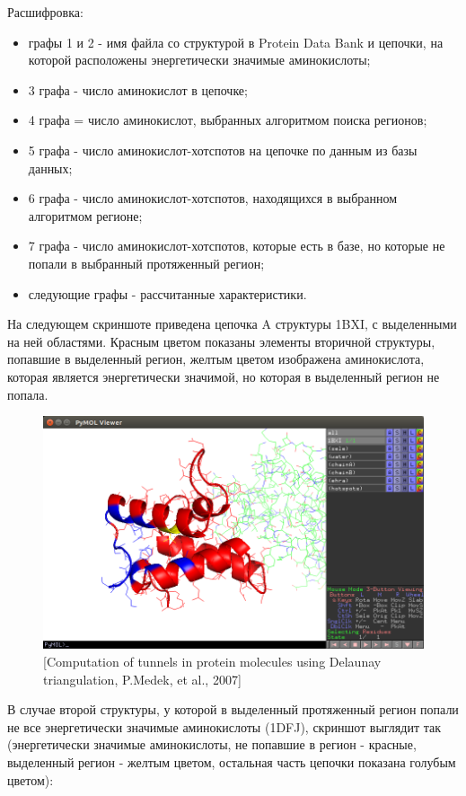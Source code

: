 Расшифровка: 
\begin{itemize}
\item графы 1 и 2 - имя файла со структурой в Protein Data Bank и цепочки, на которой расположены энергетически значимые аминокислоты;
\item 3 графа - число аминокислот в цепочке;
\item 4 графа = число аминокислот, выбранных алгоритмом поиска регионов;
\item 5 графа - число аминокислот-хотспотов на цепочке по данным из базы данных;
\item 6 графа - число аминокислот-хотспотов, находящихся в выбранном алгоритмом регионе;
\item 7 графа - число аминокислот-хотспотов, которые есть в базе, но которые не попали в выбранный протяженный регион;
\item следующие графы - рассчитанные характеристики.
\end{itemize}

На следующем скриншоте приведена цепочка A структуры 1BXI, с выделенными на ней областями. Красным цветом показаны элементы вторичной структуры, попавшие в выделенный регион, желтым цветом изображена аминокислота, которая является энергетически значимой, но которая в выделенный регион не попала.

\begin{figure}

\includegraphics[width=\linewidth]{1BXI.png}
\caption{\small{[Computation of tunnels in protein molecules using
Delaunay triangulation, P.Medek, et al., 2007]
 }}
\label{fig:1BXI}

\end{figure}

В случае второй структуры, у которой в выделенный протяженный регион попали не все энергетически значимые аминокислоты (1DFJ), скриншот выглядит так (энергетически значимые аминокислоты, не попавшие в регион - красные, выделенный регион - желтым цветом, остальная часть цепочки показана голубым цветом):


